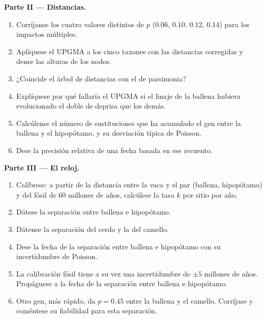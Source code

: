 \begin{problem}
\medskip
\noindent\textbf{Parte II --- Distancias.}
\begin{enumerate}[resume]
  \item Corríjanse los cuatro valores distintos de $p$ ($0.06$, $0.10$, $0.12$,
        $0.14$) para los impactos múltiples.
  \item Aplíquese el UPGMA a los cinco taxones con las distancias
        corregidas y dense las alturas de los nodos.
  \item ¿Coincide el árbol de distancias con el de parsimonia?
  \item Explíquese por qué fallaría el UPGMA si el linaje de la ballena
        hubiera evolucionado el doble de deprisa que los demás.
  \item Calcúlense el número de sustituciones que ha acumulado el gen entre
        la ballena y el hipopótamo, y su desviación típica de Poisson.
  \item Dese la precisión relativa de una fecha basada en ese recuento.
\end{enumerate}

\medskip
\noindent\textbf{Parte III --- El reloj.}
\begin{enumerate}[resume]
  \item Calíbrese: a partir de la distancia entre la vaca y el par
        (ballena, hipopótamo) y del fósil de 60 millones de años,
        calcúlese la tasa $k$ por sitio por año.
  \item Dátese la separación entre ballena e hipopótamo.
  \item Dátense la separación del cerdo y la del camello.
  \item Dese la fecha de la separación entre ballena e hipopótamo con su
        incertidumbre de Poisson.
  \item La calibración fósil tiene a su vez una incertidumbre de $\pm 5$
        millones de años. Propáguese a la fecha de la separación entre
        ballena e hipopótamo.
  \item Otro gen, más rápido, da $p = 0.45$ entre la ballena y el camello.
        Corríjase y coméntese su fiabilidad para esta separación.
\end{enumerate}


\end{problem}
